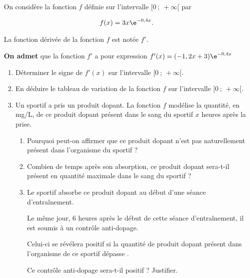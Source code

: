 \medskip

On considère la fonction $f$ définie sur l'intervalle $[0~;~+\infty[$ par 

\[f(x)=3x\e^{-0,4x}.\]

La fonction dérivée de la fonction $f$ est notée $f'$.

\textbf{On admet} que la fonction $f'$ a pour expression $f'(x)=(- 1,2x + 3)\e^{-0,4x}$

\medskip

\begin{enumerate}
\item Déterminer le signe de $f'(x)$ sur l'intervalle $[0~;~+\infty[$.
\item En déduire le tableau de variation de la fonction $f$ sur l'intervalle $[0~;~+\infty[$.
\item Un sportif a pris un produit dopant. La fonction $f$ modélise la quantité, en mg/L, de
ce produit dopant présent dans le sang du sportif $x$ heures après la prise.
	\begin{enumerate}
		\item  Pourquoi peut-on affirmer que ce produit dopant n'est pas naturellement présent
dans l'organisme du sportif ?
		\item Combien de temps après son absorption, ce produit dopant sera-t-il présent en
quantité maximale dans le sang du sportif ?
		\item Le sportif absorbe ce produit dopant au début d'une séance d'entraînement.

Le même jour, 6 heures après le début de cette séance d'entraînement, il est soumis à un contrôle anti-dopage.

Celui-ci se révélera positif si la quantité de produit dopant présent dans l'organisme de ce sportif dépasse .

Ce contrôle anti-dopage sera-t-il positif ? Justifier. 
	\end{enumerate}
\end{enumerate}
